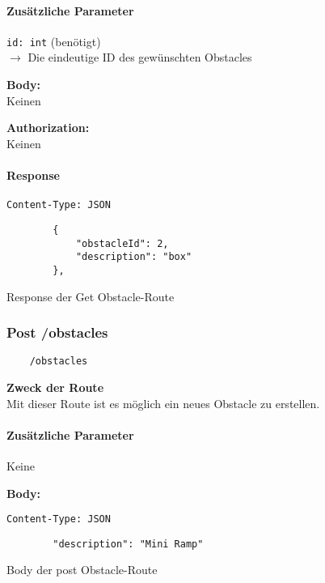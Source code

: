 \paragraph{Zusätzliche Parameter}
\lstinline{id: int} (benötigt) \\
$\rightarrow$ Die eindeutige ID des gewünschten Obstacles


\textbf{Body:} \\
Keinen

\textbf{Authorization:} \\
Keinen

\paragraph{Response}
\begin{code}
    \lstinline{Content-Type: JSON}
    \begin{lstlisting}
        {
            "obstacleId": 2,
            "description": "box"
        },
    \end{lstlisting}
    \caption{Response der Get Obstacle-Route}
\end{code}

\pagebreak


\subsubsection{Post /obstacles}

\begin{lstlisting}
    /obstacles
\end{lstlisting}

\textbf{Zweck der Route} \\
Mit dieser Route ist es möglich ein neues Obstacle zu erstellen.





\paragraph{Zusätzliche Parameter}
Keine


\textbf{Body:} \\
\begin{code}
    \lstinline{Content-Type: JSON}
    \begin{lstlisting}
        "description": "Mini Ramp"
    \end{lstlisting}
    \caption{Body der post Obstacle-Route}
\end{code}

